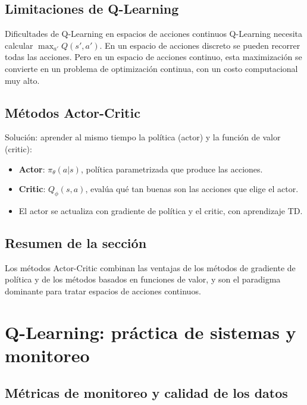 \documentclass[a4paper]{article}
\begin{document}
\subsection{Limitaciones de Q-Learning}

\begin{warningbox}{Dificultades de Q-Learning en espacios de acciones continuos}
Q-Learning necesita calcular $\max_{a'} Q(s', a')$. En un espacio de acciones discreto se pueden recorrer todas las acciones. Pero en un espacio de acciones continuo, esta maximización se convierte en un problema de optimización continua, con un costo computacional muy alto.
\end{warningbox}

\subsection{Métodos Actor-Critic}

Solución: aprender al mismo tiempo la política (actor) y la función de valor (critic):
\begin{itemize}
    \item \textbf{Actor}: $\pi_\theta(a|s)$, política parametrizada que produce las acciones.
    \item \textbf{Critic}: $Q_\phi(s, a)$, evalúa qué tan buenas son las acciones que elige el actor.
    \item El actor se actualiza con gradiente de política y el critic, con aprendizaje TD.
\end{itemize}

\subsection{Resumen de la sección}

Los métodos Actor-Critic combinan las ventajas de los métodos de gradiente de política y de los métodos basados en funciones de valor, y son el paradigma dominante para tratar espacios de acciones continuos.

\section{Q-Learning: práctica de sistemas y monitoreo}

\subsection{Métricas de monitoreo y calidad de los datos}
\end{document}
